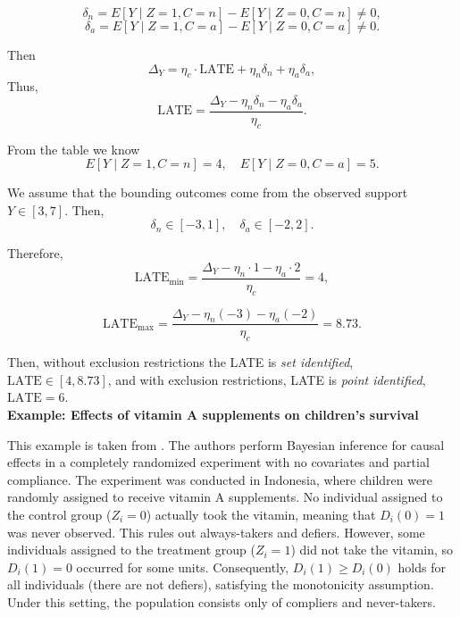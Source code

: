 \[
\delta_n = E[Y \mid Z=1, C=n] - E[Y \mid Z=0, C=n] \neq 0,
\]
\[
\delta_a = E[Y \mid Z=1, C=a] - E[Y \mid Z=0, C=a] \neq 0.
\]

Then
\[
\Delta_Y = \eta_c \cdot \text{LATE} + \eta_n \delta_n + \eta_a \delta_a,
\]
Thus,
\[
\text{LATE} = \frac{\Delta_Y - \eta_n \delta_n - \eta_a \delta_a}{\eta_c}.
\]

From the table we know
\[
E[Y \mid Z=1, C=n] = 4, \quad E[Y \mid Z=0, C=a] = 5.
\]

We assume that the bounding outcomes come from the observed support \(Y \in [3,7]\). Then,
\[
\delta_n \in [-3,1], \quad \delta_a \in [-2,2].
\]

Therefore,
\[
\text{LATE}_{\min} = \frac{\Delta_Y - \eta_n \cdot 1 - \eta_a \cdot 2}{\eta_c}
= 4,
\]

\[
\text{LATE}_{\max} = \frac{\Delta_Y - \eta_n (-3) - \eta_a (-2)}{\eta_c}
= 8.73.
\]

Then, without exclusion restrictions the LATE is \textit{set identified}, \(\text{LATE} \in [4, 8.73]\), and with exclusion restrictions, LATE is \textit{point identified}, \(\text{LATE} = 6\).\\

\textbf{Example: Effects of vitamin A supplements on children's survival}

This example is taken from \cite{imbens1997bayesian}. The authors perform Bayesian inference for causal effects in a completely randomized experiment with no covariates and partial compliance. The experiment was conducted in Indonesia, where children were randomly assigned to receive vitamin A supplements. No individual assigned to the control group ($Z_i = 0$) actually took the vitamin, meaning that $D_i(0) = 1$ was never observed. This rules out always-takers and defiers. However, some individuals assigned to the treatment group ($Z_i = 1$) did not take the vitamin, so $D_i(1) = 0$ occurred for some units. Consequently, $D_i(1) \geq D_i(0)$ holds for all individuals (there are not defiers), satisfying the monotonicity assumption. Under this setting, the population consists only of compliers and never-takers.

